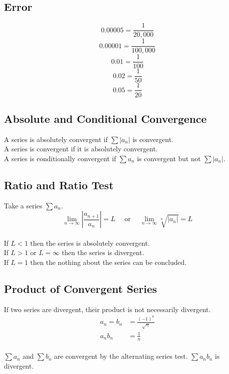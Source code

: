 \documentclass[12pt]{article}
\begin{document}
\subsection{Error}

$$0.00005 = \frac{1}{20,000}$$
$$0.00001 = \frac{1}{100,000}$$
$$0.01 = \frac{1}{100}$$
$$0.02 = \frac{1}{50}$$
$$0.05 = \frac{1}{20}$$


\subsection{Absolute and Conditional Convergence}

A series is absolutely convergent if $\sum \left|a_n\right|$ is convergent.\\
A series is convergent if it is absolutely convergent.\\
A series is conditionally convergent if $\sum a_n$ is convergent but not $\sum \left|a_n\right|$.\\


\subsection{Ratio and Ratio Test}

Take a series $\sum a_n$.
\\
\begin{displaymath}
    \lim_{n\to\infty} \left|\frac{a_{n+1}}{a_n}\right| = L\quad\text{ or }\quad
    \lim_{n\to\infty} \sqrt[n]{\left|a_n\right|} = L
\end{displaymath}
\\
If $L < 1$ then the series is absolutely convergent.\\
If $L > 1\text{ or }L = \infty$ then the series is divergent.\\
If $L = 1$ then the nothing about the series can be concluded.


\subsection{Product of Convergent Series}

If two series are divergent, their product is not necessarily divergent.\\
\begin{align*}
    a_n = b_n &= \frac{(-1)^n}{\sqrt{n}}\\
    a_nb_n &= \frac{1}{n}
\end{align*}
\\
$\sum a_n$ and $\sum b_n$ are convergent by the alternating series test. $\sum a_nb_n$ is divergent.
\end{document}

